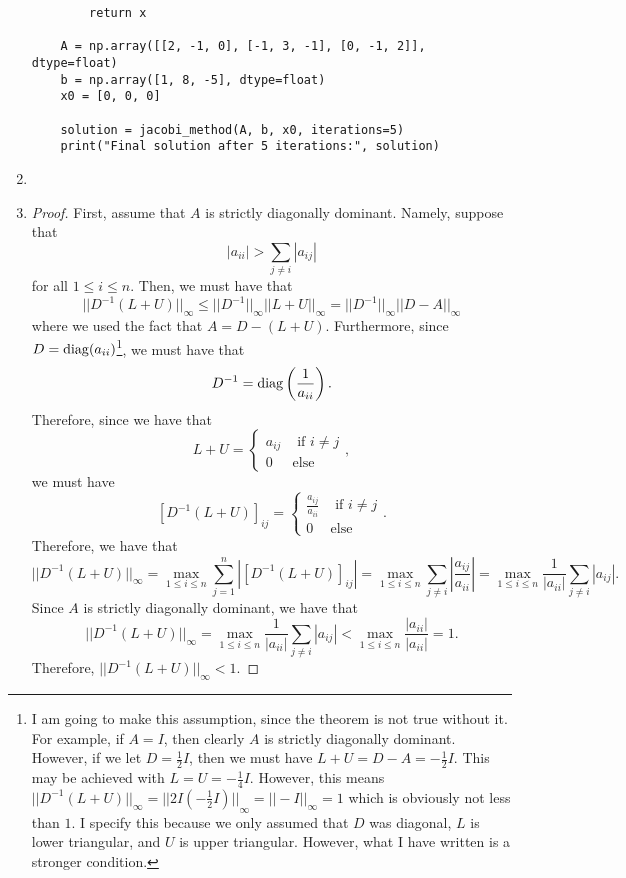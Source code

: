 \documentclass[12pt]{article}
\begin{document}
\begin{enumerate}[leftmargin=0em]
\begin{lstlisting}
        return x

    A = np.array([[2, -1, 0], [-1, 3, -1], [0, -1, 2]], dtype=float)
    b = np.array([1, 8, -5], dtype=float)
    x0 = [0, 0, 0]

    solution = jacobi_method(A, b, x0, iterations=5)
    print("Final solution after 5 iterations:", solution)
    \end{lstlisting}

    \item 

    \item 
    \begin{proof}
        First, assume that $A$ is strictly diagonally dominant. Namely, suppose that
        \[|a_{ii}| > \sum_{j\neq i}|a_{ij}|\]
        for all $1\leq i \leq n$. Then, we must have that
        \[{||D^{-1}(L+U)||}_{\infty} \leq {||D^{-1}||}_{\infty} {||L+U||}_{\infty} =  {||D^{-1}||}_{\infty}{||D-A||}_{\infty}\]
        where we used the fact that $A=D-(L+U)$. Furthermore, since $D=\operatorname{diag}(a_{ii})$\footnote{I am going to make this assumption, since the theorem is not true without it. For example, if $A=I$, then clearly $A$ is strictly diagonally dominant. However, if we let $D=\frac{1}{2}I$, then we must have $L+U= D-A=-\frac{1}{2}I$. This may be achieved with $L=U=-\frac{1}{4}I$. However, this means ${||D^{-1}(L+U)||}_{\infty}= {||2I\left(-\frac{1}{2}I\right)||}_{\infty} = {||-I||}_{\infty} = 1$ which is obviously not less than $1$. I specify this because we only assumed that $D$ was diagonal, $L$ is lower triangular, and $U$ is upper triangular. However, what I have written is a stronger condition.}, we must have that
        \[D^{-1} = \operatorname{diag}\left(\frac{1}{a_{ii}}\right).\]
        Therefore, since we have that
        \[L+U =
        \begin{cases}
            a_{ij} & \text{ if } i\neq j\\
            0 & \text{else}    
        \end{cases},\]
        we must have
        \[{[D^{-1}(L+U)]}_{ij} = 
        \begin{cases}
            \frac{a_{ij}}{a_{ii}} & \text{ if  } i\neq j\\
            0 & \text{else}
        \end{cases}.\]
        Therefore, we have that
        \[{||D^{-1}(L+U)||}_{\infty} = \max_{1\leq i \leq n}\sum_{j=1}^{n}\left|{[D^{-1}(L+U)]}_{ij}\right| = \max_{1\leq i \leq n}\sum_{j\neq i} \left|\frac{a_{ij}}{a_{ii}}\right|= \max_{1\leq i\leq n}\frac{1}{|a_{ii}|}\sum_{j\neq i}|a_{ij}|.\]
        Since $A$ is strictly diagonally dominant, we have that
        \[{||D^{-1}(L+U)||}_{\infty}= \max_{1\leq i\leq n}\frac{1}{|a_{ii}|}\sum_{j\neq i}|a_{ij}| < \max_{1\leq i \leq n}\frac{|a_{ii}|}{|a_{ii}|} = 1.\]
        Therefore, ${||D^{-1}(L+U)||}_{\infty}<1$.


\end{proof}
\end{enumerate}
\end{document}
